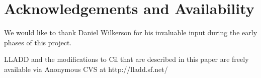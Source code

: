 \documentclass[10pt,letterpaper,twocolumn,english]{article}
\newcommand{\yad}{LLADD\xspace}
\begin{document}
\section{Acknowledgements and Availability}

We would like to thank Daniel Wilkerson for his invaluable input during
the early phases of this project.

\yad and the modifications to Cil that are described in this paper are
freely available via Anonymous CVS at http://lladd.sf.net/


\begin{thebibliography}{99}
\begin{small}












\end{small}
\end{thebibliography}
\end{document}
